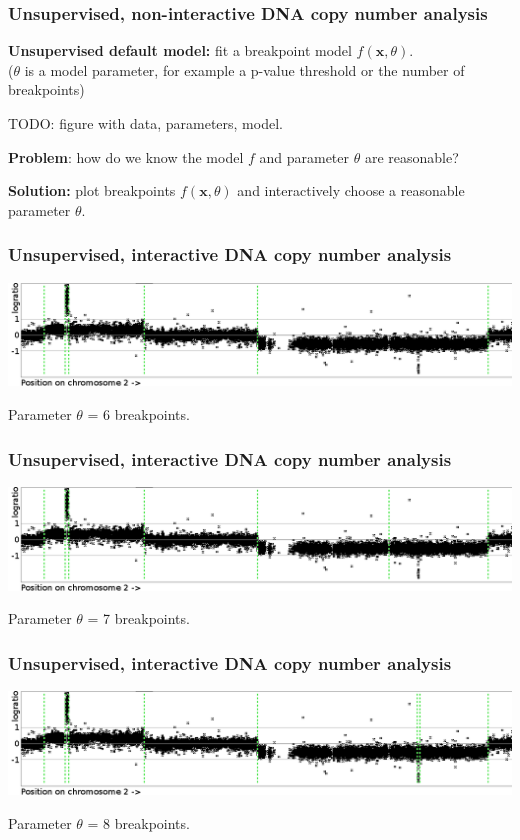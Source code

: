 \documentclass{beamer}
\begin{document}
\begin{frame}
  \frametitle{Unsupervised, non-interactive DNA copy number analysis}

  \textbf{Unsupervised default model:} 
  fit a breakpoint model $f(\mathbf x, \theta)$.\\
  ($\theta$ is a model parameter, for example a p-value threshold or
  the number of breakpoints)

  TODO: figure with data, parameters, model.

  \textbf{Problem}: how do we know the model $f$ and parameter
  $\theta$ are reasonable?

  \vskip 0.1in

  \textbf{Solution:} plot breakpoints $f(\mathbf x, \theta)$ and
  interactively choose a reasonable parameter $\theta$.
\end{frame}

\begin{frame}
  \frametitle{Unsupervised, interactive DNA copy number analysis}
  \includegraphics[width=\textwidth]{unlabeled-breakpoints-6}

  Parameter $\theta$ = 6 breakpoints.
\end{frame}

\begin{frame}
  \frametitle{Unsupervised, interactive DNA copy number analysis}
  \includegraphics[width=\textwidth]{unlabeled-breakpoints-7}

  Parameter $\theta$ = 7 breakpoints.
\end{frame}

\begin{frame}
  \frametitle{Unsupervised, interactive DNA copy number analysis}
  \includegraphics[width=\textwidth]{unlabeled-breakpoints-8}

  Parameter $\theta$ = 8 breakpoints.
\end{frame}
\end{document}

